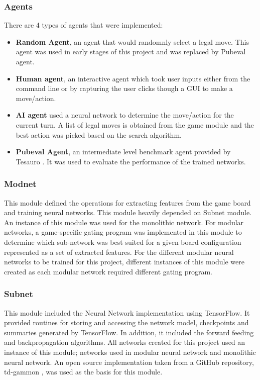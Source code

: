 \documentclass[12pt,a4paper]{article}
\begin{document}
\subsubsection{Agents}
There are 4 types of agents that were implemented: 
\begin{itemize}
    \item \textbf{Random Agent}, an agent that would randomnly select a legal move. This agent was used in early stages of this project and was replaced by Pubeval agent.
    \item \textbf{Human agent}, an interactive agent which took user inputs either from the command line or by capturing the user clicks though a GUI to make a move/action.
    \item \textbf{AI agent} used a neural network to determine the move/action for the current turn. A list of legal moves is obtained from the game module and the best action was picked based on the search algorithm.
    \item \textbf{Pubeval Agent}, an intermediate level benchmark agent provided by Tesauro \citeyear{pubeval}. It was used to evaluate the performance of the trained networks.
\end{itemize}

\subsubsection{Modnet}
This module defined the operations for extracting features from the game board and training neural networks. This module heavily depended on Subnet module. An instance of this module was used for the monolithic network. For modular networks, a game-specific gating program was implemented in this module to determine which sub-network was best suited for a given board configuration represented as a set of extracted features. For the different modular neural networks to be trained for this project, different instances of this module were created as each modular network required different gating program.

\subsubsection{Subnet}
This module included the Neural Network implementation using TensorFlow. It provided routines for storing and accessing the network model, checkpoints and summaries generated by TensorFlow. In addition, it included the forward feeding and backpropagation algorithms. All networks created for this project used an instance of this module; networks used in modular neural network and monolithic neural network. An open source implementation taken from a GitHub repository, td-gammon \cite{fomorians}, was used as the basis for this module. 
\end{document}
